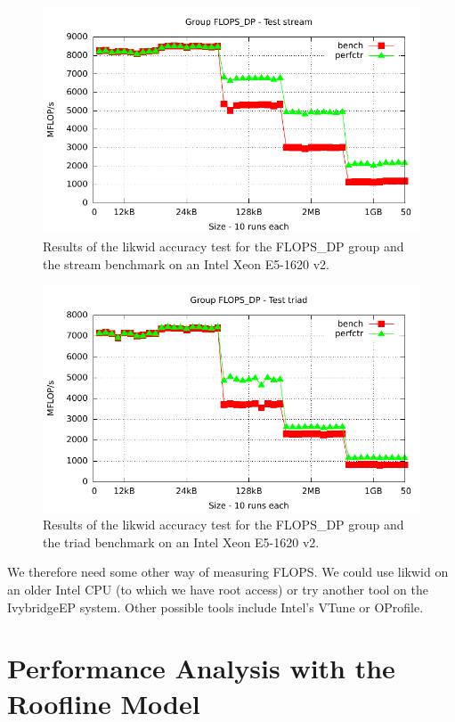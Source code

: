 \documentclass[12pt]{article}
\begin{document}
\begin{figure}
\centering
\includegraphics[width=120mm]{FLOPS_DP_stream_ivybridgeEP.pdf}
\caption{Results of the likwid accuracy test for the FLOPS\_DP group
  and the stream benchmark on an Intel Xeon E5-1620 v2.}
\label{FIG_flops_dp_stream_test}
\end{figure}

\begin{figure}
\centering
\includegraphics[width=120mm]{FLOPS_DP_triad_ivybridgeEP.pdf}
\caption{Results of the likwid accuracy test for the FLOPS\_DP group
  and the triad benchmark on an Intel Xeon E5-1620 v2.}
\label{FIG_flops_dp_triad_test}
\end{figure}

We therefore need some other way of measuring FLOPS. We could use
likwid on an older Intel CPU (to which we have root access) or try
another tool on the IvybridgeEP system. Other possible tools include
Intel's VTune or OProfile.

\section{Performance Analysis with the Roofline Model}
\end{document}
